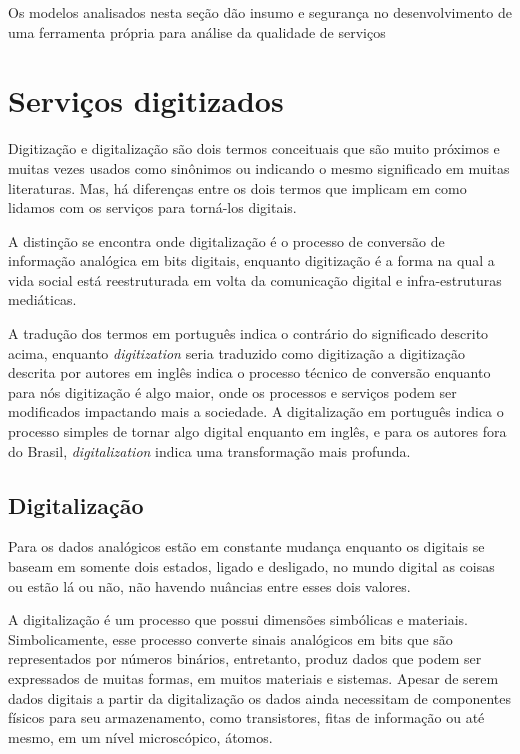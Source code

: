 Os modelos analisados nesta seção dão insumo e segurança no desenvolvimento de uma ferramenta própria para análise da qualidade de serviços

\section{Serviços digitizados}

Digitização e digitalização são dois termos conceituais que são muito próximos e muitas vezes usados como sinônimos ou indicando o mesmo significado em muitas literaturas. Mas, há diferenças entre os dois termos que implicam em como lidamos com os serviços para torná-los digitais.

A distinção se encontra onde digitalização é o processo de conversão de informação analógica em bits digitais, enquanto digitização é a forma na qual a vida social está reestruturada em volta da comunicação digital e infra-estruturas mediáticas.

A tradução dos termos em português indica o contrário do significado descrito acima, enquanto \textit{digitization} seria traduzido como digitização a digitização descrita por autores em inglês indica o processo técnico de conversão enquanto para nós digitização é algo maior, onde os processos e serviços podem ser modificados impactando mais a sociedade. A digitalização em português indica o processo simples de tornar algo digital enquanto em inglês, e para os autores fora do Brasil, \textit{digitalization} indica uma transformação mais profunda.

\subsection{Digitalização}

Para \cite[p.~02]{feldman1997} os dados analógicos estão em constante mudança enquanto os digitais se baseam em somente dois estados, ligado e desligado, no mundo digital as coisas ou estão lá ou não, não havendo nuâncias entre esses dois valores. 

A digitalização é um processo que possui dimensões simbólicas e materiais. Simbolicamente, esse processo converte sinais analógicos em bits que são representados por números binários, entretanto, produz dados que podem ser expressados de muitas formas, em muitos materiais e sistemas. Apesar de serem dados digitais a partir da digitalização os dados ainda necessitam de componentes físicos para seu armazenamento, como transistores, fitas de informação ou até mesmo, em um nível microscópico, átomos. 

